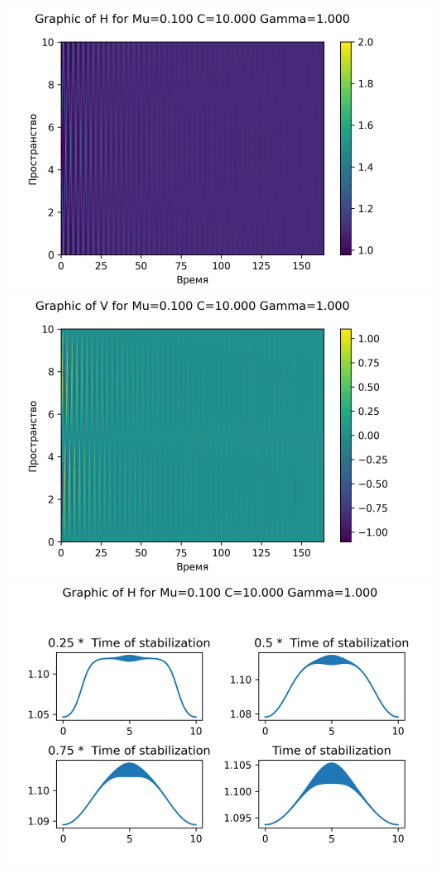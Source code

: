 \begin{figure}[H]
	\centering
	\includegraphics[scale=0.5]{../graphs_data_nonsmooth_1/value/Graph_H_mu0.100_C10.000_gamma1.000.png}
	\includegraphics[scale=0.5]{../graphs_data_nonsmooth_1/value/Graph_V_mu0.100_C10.000_gamma1.000.png}	
	\includegraphics[scale=0.5]{../graphs_data_nonsmooth_1/slices/Graph_H_mu0.100_C10.000_gamma1.000.png}

\end{figure}
